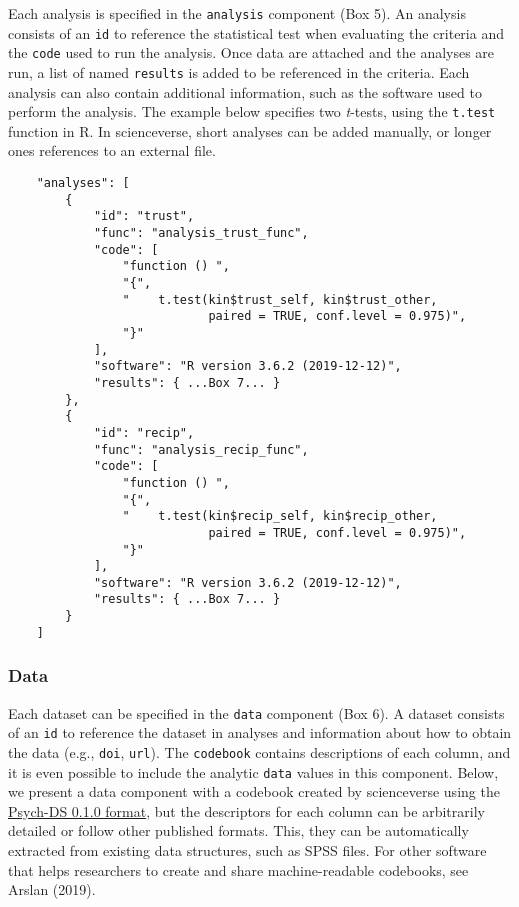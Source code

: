\documentclass[english,doc,floatsintext]{apa6}
\begin{document}
Each analysis is specified in the \texttt{analysis} component (Box 5). An analysis consists of an \texttt{id} to reference the statistical test when evaluating the criteria and the \texttt{code} used to run the analysis. Once data are attached and the analyses are run, a list of named \texttt{results} is added to be referenced in the criteria. Each analysis can also contain additional information, such as the software used to perform the analysis. The example below specifies two \emph{t}-tests, using the \texttt{t.test} function in R. In scienceverse, short analyses can be added manually, or longer ones references to an external file.

\begin{tcolorbox}[colback=black!5!white,colframe=white!5!black,title=Box 5. The analysis component.]
\begin{verbatim}
    "analyses": [
        {
            "id": "trust",
            "func": "analysis_trust_func",
            "code": [
                "function () ",
                "{",
                "    t.test(kin$trust_self, kin$trust_other, 
                            paired = TRUE, conf.level = 0.975)",
                "}"
            ],
            "software": "R version 3.6.2 (2019-12-12)",
            "results": { ...Box 7... }
        },
        {
            "id": "recip",
            "func": "analysis_recip_func",
            "code": [
                "function () ",
                "{",
                "    t.test(kin$recip_self, kin$recip_other, 
                            paired = TRUE, conf.level = 0.975)",
                "}"
            ],
            "software": "R version 3.6.2 (2019-12-12)",
            "results": { ...Box 7... }
        }
    ]
\end{verbatim}
\end{tcolorbox}

\hypertarget{data}{%
\subsubsection{Data}\label{data}}

Each dataset can be specified in the \texttt{data} component (Box 6). A dataset consists of an \texttt{id} to reference the dataset in analyses and information about how to obtain the data (e.g., \texttt{doi}, \texttt{url}). The \texttt{codebook} contains descriptions of each column, and it is even possible to include the analytic \texttt{data} values in this component. Below, we present a data component with a codebook created by scienceverse using the \href{https://docs.google.com/document/d/1u8o5jnWk0Iqp_J06PTu5NjBfVsdoPbBhstht6W0fFp0/edit\#heading=h.caxnnxqaobj}{Psych-DS 0.1.0 format}, but the descriptors for each column can be arbitrarily detailed or follow other published formats. This, they can be automatically extracted from existing data structures, such as SPSS files. For other software that helps researchers to create and share machine-readable codebooks, see Arslan (2019).
\end{document}
